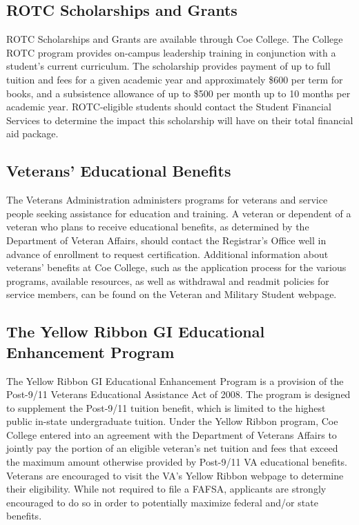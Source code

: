 \documentclass[
  letterpaper,
]{scrbook}
\begin{document}
\subsection{\texorpdfstring{\textbf{ROTC Scholarships and
Grants}}{ROTC Scholarships and Grants}}\label{rotc-scholarships-and-grants}

ROTC Scholarships and Grants are available through Coe College. The
College ROTC program provides on-campus leadership training in
conjunction with a student's current curriculum. The scholarship
provides payment of up to full tuition and fees for a given academic
year and approximately \$600 per term for books, and a subsistence
allowance of up to \$500 per month up to 10 months per academic year.
ROTC-eligible students should contact the Student Financial Services to
determine the impact this scholarship will have on their total financial
aid package.

\subsection{\texorpdfstring{\textbf{Veterans' Educational
Benefits}}{Veterans' Educational Benefits}}\label{veterans-educational-benefits}

The Veterans Administration administers programs for veterans and
service people seeking assistance for education and training. A veteran
or dependent of a veteran who plans to receive educational benefits, as
determined by the Department of Veteran Affairs, should contact the
Registrar's Office well in advance of enrollment to request
certification. Additional information about veterans' benefits at Coe
College, such as the application process for the various programs,
available resources, as well as withdrawal and readmit policies for
service members, can be found on the Veteran and Military Student
webpage.

\subsection{\texorpdfstring{\textbf{The Yellow Ribbon GI Educational
Enhancement
Program}}{The Yellow Ribbon GI Educational Enhancement Program}}\label{the-yellow-ribbon-gi-educational-enhancement-program}

The Yellow Ribbon GI Educational Enhancement Program is a provision of
the Post-9/11 Veterans Educational Assistance Act of 2008. The program
is designed to supplement the Post-9/11 tuition benefit, which is
limited to the highest public in-state undergraduate tuition. Under the
Yellow Ribbon program, Coe College entered into an agreement with the
Department of Veterans Affairs to jointly pay the portion of an eligible
veteran's net tuition and fees that exceed the maximum amount otherwise
provided by Post-9/11 VA educational benefits. Veterans are encouraged
to visit the VA's Yellow Ribbon webpage to determine their eligibility.
While not required to file a FAFSA, applicants are strongly encouraged
to do so in order to potentially maximize federal and/or state benefits.
\end{document}
